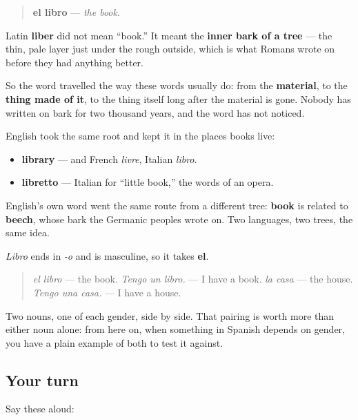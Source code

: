 \begin{cousinweb}
\begin{quote}
\textbf{el libro} — \emph{the book}.
\end{quote}

Latin \textbf{liber} did not mean \textquotedblleft{}book.\textquotedblright{} It meant the \textbf{inner bark of a tree} — the thin, pale layer just under the rough outside, which is what Romans wrote on before they had anything better.

So the word travelled the way these words usually do: from the \textbf{material}, to the \textbf{thing made of it}, to the thing itself long after the material is gone. Nobody has written on bark for two thousand years, and the word has not noticed.

English took the same root and kept it in the places books live:

\begin{itemize}
\raggedright
  \item \textbf{library} — and French \emph{livre}, Italian \emph{libro}.
  \item \textbf{libretto} — Italian for \textquotedblleft{}little book,\textquotedblright{} the words of an opera.
\end{itemize}

English's own word went the same route from a different tree: \textbf{book} is related to \textbf{beech}, whose bark the Germanic peoples wrote on. Two languages, two trees, the same idea.
\end{cousinweb}

\begin{grammarlens}[title={Grammar Lens: a masculine noun to sit beside the feminine one}]
\emph{Libro} ends in \emph{-o} and is masculine, so it takes \textbf{el}.

\begin{quote}
\emph{el libro} — the book. \emph{Tengo un libro.} — I have a book. \emph{la casa} — the house. \emph{Tengo una casa.} — I have a house.
\end{quote}

Two nouns, one of each gender, side by side. That pairing is worth more than either noun alone: from here on, when something in Spanish depends on gender, you have a plain example of both to test it against.
\end{grammarlens}

\subsection*{Your turn}
Say these aloud:

